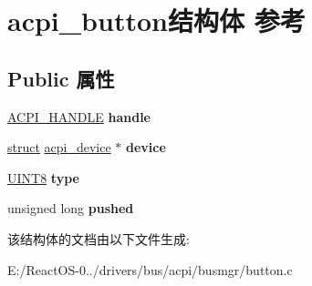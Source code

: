 \hypertarget{structacpi__button}{}\section{acpi\+\_\+button结构体 参考}
\label{structacpi__button}
\subsection*{Public 属性}
\begin{DoxyCompactItemize}
\item 
\mbox{\label{structacpi__button_a097e4f79b1c0e43277335766e564e22d}} 
\hyperlink{interfacevoid}{A\+C\+P\+I\+\_\+\+H\+A\+N\+D\+LE} {\bfseries handle}
\item 
\mbox{\label{structacpi__button_af516b7af8e558bf369944a0f91ad3413}} 
\hyperlink{interfacestruct}{struct} \hyperlink{structacpi__device}{acpi\+\_\+device} $\ast$ {\bfseries device}
\item 
\mbox{\label{structacpi__button_ab5736c79b8176d1e564a697af90605f4}} 
\hyperlink{_processor_bind_8h_ab27e9918b538ce9d8ca692479b375b6a}{U\+I\+N\+T8} {\bfseries type}
\item 
\mbox{\label{structacpi__button_a8cd95c618a2b6210b9ab23332571ab86}} 
unsigned long {\bfseries pushed}
\end{DoxyCompactItemize}


该结构体的文档由以下文件生成\+:\begin{DoxyCompactItemize}
\item 
E\+:/\+React\+O\+S-\/0../drivers/bus/acpi/busmgr/button.\+c\end{DoxyCompactItemize}
